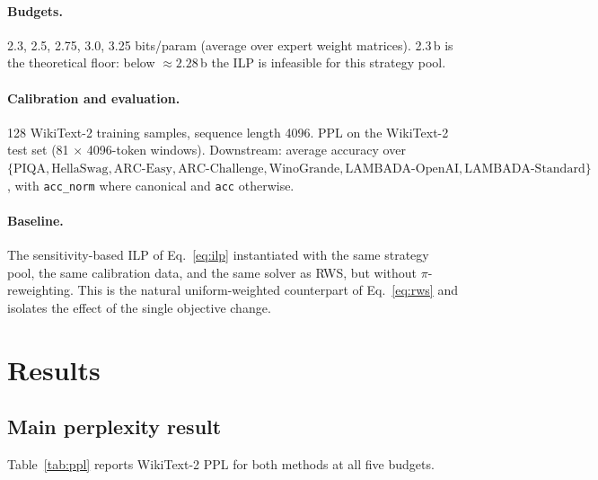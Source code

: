\documentclass{article}
\newcommand{\method}{\textsc{RWS}\xspace}
\begin{document}
\paragraph{Budgets.} 2.3, 2.5, 2.75, 3.0, 3.25 bits/param (average over expert weight matrices). 2.3\,b is the theoretical floor: below $\approx 2.28$\,b the ILP is infeasible for this strategy pool.

\paragraph{Calibration and evaluation.} 128 WikiText-2 training samples, sequence length 4096. PPL on the WikiText-2 test set (81 $\times$ 4096-token windows). Downstream: average accuracy over $\{\text{PIQA}, \text{HellaSwag}, \text{ARC-Easy}, \text{ARC-Challenge}, \text{WinoGrande}, \text{LAMBADA-OpenAI}, \text{LAMBADA-Standard}\}$, with \texttt{acc\_norm} where canonical and \texttt{acc} otherwise.

\paragraph{Baseline.} The sensitivity-based ILP of Eq.~\ref{eq:ilp} instantiated with the same strategy pool, the same calibration data, and the same solver as \method, but without $\pi$-reweighting. This is the natural uniform-weighted counterpart of Eq.~\ref{eq:rws} and isolates the effect of the single objective change.

\section{Results}
\label{sec:results}

\subsection{Main perplexity result}

Table~\ref{tab:ppl} reports WikiText-2 PPL for both methods at all five budgets.
\end{document}
